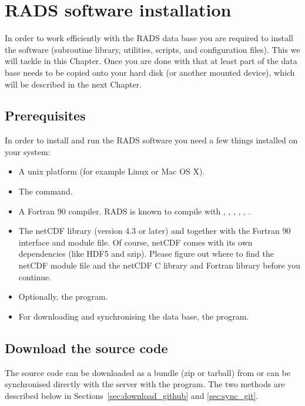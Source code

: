 \documentclass[a4paper,11pt,openany,natbib,nomargin]{thesis}
\begin{document}
\chapter{RADS software installation}
\label{ch:installation}
In order to work efficiently with the RADS data base you are required to install the software (subroutine library, utilities, scripts, and configuration files). This we will tackle in this Chapter. Once you are done with that at least part of the data base needs to be copied onto your hard disk (or another mounted device), which will be described in the next Chapter.

\section{Prerequisites}
\label{sec:prerequisites}
In order to install and run the RADS software you need a few things installed on your system:
\begin{itemize}
\item A unix platform (for example Linux or Mac OS X).
\item The  command.
\item A Fortran 90 compiler. RADS is known to compile with , , , , , .
\item The netCDF library (version 4.3 or later) and together with the Fortran 90 interface and module file.
Of course, netCDF comes with its own dependencies (like HDF5 and szip).
Please figure out where to find the netCDF module file  and the netCDF C library  and Fortran library  before you continue.
\item Optionally, the  program.
\item For downloading and synchronising the data base, the  program.
\end{itemize}

\section{Download the source code}
\label{sec:download}
The source code can be downloaded as a bundle (zip or tarball) from  or can be synchronised directly with the  server with the  program. The two methods are described below in Sections~\ref{sec:download_github} and \ref{sec:sync_git}.
\end{document}
